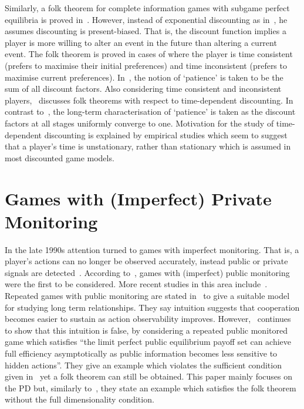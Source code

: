 Similarly, a folk theorem for complete information
games with subgame perfect equilibria is proved in~\cite{Bernergard2019}. However, instead of exponential
discounting as in~\cite{Abreu1994, Fudenberg1986}, he assumes discounting is
present-biased. That is, the discount function implies a player is more willing
to alter an event in the future than altering a current event. The folk theorem
is proved in cases of where the player is time consistent (prefers to maximise
their initial preferences) and time inconsistent (prefers to maximise current
preferences). In~\cite{Bernergard2019}, the notion of `patience' is taken to be the sum of all discount
factors. Also considering time consistent and inconsistent
players,~\cite{Li2019} discusses folk theorems with respect to time-dependent
discounting. In contrast
to~\cite{Bernergard2019}, the long-term characterisation of `patience' is taken
as the discount factors at all stages uniformly converge to one. Motivation for
the study of time-dependent discounting is explained by empirical studies which
seem to suggest that a player's time is unstationary, rather than stationary
which is assumed in most discounted game models.


\section{Games with (Imperfect) Private Monitoring}\label{sec:Games_with_(Imperfect)_Private_Monitoring}
In the late 1990s attention turned to games with imperfect monitoring. That is,
a player's actions can no longer be observed accurately, instead public or
private signals are detected~\cite{Durlauf2016}. According to~\cite{Matsushima2004}, games with (imperfect) public
monitoring were the first to be considered. More recent
studies in this area include~\cite{Chassang2011,Kandori2006}.
Repeated games with public monitoring are stated
in~\cite{Kandori2006} to give a
suitable model for studying long term relationships. They say intuition
suggests that cooperation becomes easier to sustain as action observability
improves. However,~\cite{Kandori2006} continues to show that this intuition is
false, by considering a repeated public monitored game which satisfies ``the
limit perfect public equilibrium payoff set can achieve full efficiency
asymptotically as public information becomes less sensitive to hidden actions''.
They give an example which violates the sufficient condition given
in~\cite{Maskin1994} yet a folk theorem can still be obtained. This paper mainly
focuses on
the PD but, similarly to~\cite{Abreu1994}, they state an example
which satisfies the folk theorem without the full dimensionality condition. 

